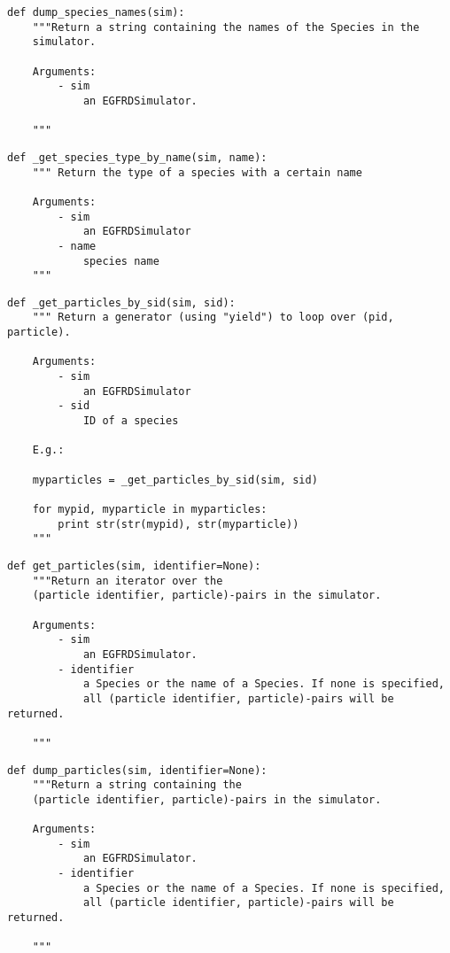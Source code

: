 \documentclass[a4paper,10pt]{article}
\begin{document}
\begin{verbatim}
def dump_species_names(sim):
    """Return a string containing the names of the Species in the 
    simulator.

    Arguments:
        - sim
            an EGFRDSimulator.

    """
\end{verbatim}

\begin{verbatim}
def _get_species_type_by_name(sim, name):
    """ Return the type of a species with a certain name

    Arguments:
        - sim
            an EGFRDSimulator
        - name
            species name
    """
\end{verbatim}

\begin{verbatim}
def _get_particles_by_sid(sim, sid):
    """ Return a generator (using "yield") to loop over (pid, particle).
    
    Arguments:
        - sim
            an EGFRDSimulator
        - sid
            ID of a species

    E.g.:
    
    myparticles = _get_particles_by_sid(sim, sid)

    for mypid, myparticle in myparticles:
        print str(str(mypid), str(myparticle))
    """
\end{verbatim}

\begin{verbatim}
def get_particles(sim, identifier=None):
    """Return an iterator over the
    (particle identifier, particle)-pairs in the simulator.

    Arguments:
        - sim
            an EGFRDSimulator.
        - identifier
            a Species or the name of a Species. If none is specified, 
            all (particle identifier, particle)-pairs will be returned.

    """
\end{verbatim}

\begin{verbatim}
def dump_particles(sim, identifier=None):
    """Return a string containing the
    (particle identifier, particle)-pairs in the simulator.

    Arguments:
        - sim
            an EGFRDSimulator.
        - identifier
            a Species or the name of a Species. If none is specified, 
            all (particle identifier, particle)-pairs will be returned.

    """
\end{verbatim}
\end{document}
